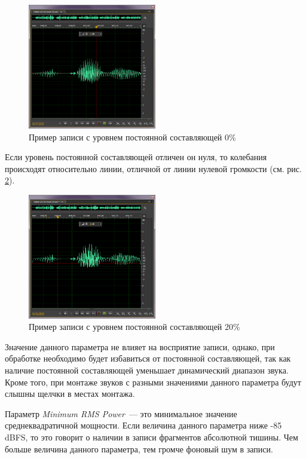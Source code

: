 \documentclass[oneside, final, 14pt]{extreport}
\begin{document}
\begin{figure}[h!]
\centering
\includegraphics[width=0.5\textwidth]{pic-dcoffset-01}
\caption{Пример записи с уровнем постоянной составляющей 0\%}
\label{pic-dcoffset-01}
\end{figure}
Если уровень постоянной составляющей отличен он нуля, то колебания происходят относительно линии, отличной от линии нулевой громкости (см. рис. \ref{pic-dcoffset-02}).

\begin{figure}[h!]
\centering
\includegraphics[width=0.5\textwidth]{pic-dcoffset-02}
\caption{Пример записи с уровнем постоянной составляющей 20\%}
\label{pic-dcoffset-02}
\end{figure}

Значение данного параметра не влияет на восприятие записи, однако, при обработке необходимо будет избавиться от постоянной составляющей, так как наличие постоянной составляющей уменьшает динамический диапазон звука. Кроме того, при монтаже звуков с разными значениями данного параметра будут слышны щелчки в местах
монтажа.

Параметр \textit{Minimum RMS Power}~--- это минимальное значение среднеквадратичной мощности. Если величина данного параметра ниже -85 dBFS, то это говорит о наличии в записи фрагментов абсолютной тишины. Чем больше величина данного параметра, тем громче фоновый шум в записи.
\end{document}
